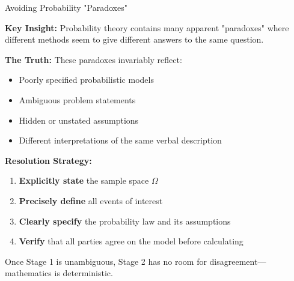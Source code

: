 \begin{keyconceptboxbreak}{Avoiding Probability "Paradoxes"}

\textbf{Key Insight:} Probability theory contains many apparent "paradoxes" where different methods seem to give different answers to the same question.

\textbf{The Truth:} These paradoxes invariably reflect:
\begin{itemize}
    \item Poorly specified probabilistic models
    \item Ambiguous problem statements
    \item Hidden or unstated assumptions
    \item Different interpretations of the same verbal description
\end{itemize}

\textbf{Resolution Strategy:}
\begin{enumerate}
    \item \textbf{Explicitly state} the sample space $\Omega$
    \item \textbf{Precisely define} all events of interest
    \item \textbf{Clearly specify} the probability law and its assumptions
    \item \textbf{Verify} that all parties agree on the model before calculating
\end{enumerate}

Once Stage 1 is unambiguous, Stage 2 has no room for disagreement—mathematics is deterministic.

\end{keyconceptboxbreak}

